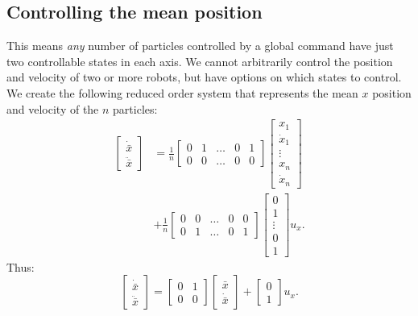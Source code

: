\subsection{Controlling the mean position}\label{sec:controlMeanPosition}
This means \emph{any} number of particles controlled by a global command have just two controllable states in each axis. We cannot arbitrarily control the position and velocity of two or more robots, but have options on which states to control.  %
We create the following reduced order system that represents the mean $x$ position and velocity of the $n$ particles:
\begin{align}
\begin{bmatrix}\nonumber
\dot{\bar{x}} \\
\ddot{\bar{x}}
\end{bmatrix} &= \frac{1}{n} \begin{bmatrix}
0& 1& \ldots &0& 1 \\
0& 0& \ldots &0& 0
\end{bmatrix}
\begin{bmatrix}
x_{1}\\
\dot{x}_{1}\\
\vdots\\
x_{n}\\
\dot{x}_{n}
\end{bmatrix} \\
&+ \frac{1}{n}\begin{bmatrix}
0& 0&  \ldots &0& 0 \\
0& 1&  \ldots &0& 1
\end{bmatrix}\begin{bmatrix} 
0\\
1\\
\vdots\\
0\\
1
\end{bmatrix} u_x.
\end{align}
Thus:
\begin{equation}
\begin{bmatrix}
\dot{\bar{x}} \\
\ddot{\bar{x}}
\end{bmatrix} = \begin{bmatrix}
0& 1 \\
0& 0
\end{bmatrix}
\begin{bmatrix}
\bar{x}\\
\dot{\bar{x}}
\end{bmatrix} + \begin{bmatrix} 
0\\
1
\end{bmatrix} u_x.
\end{equation}

